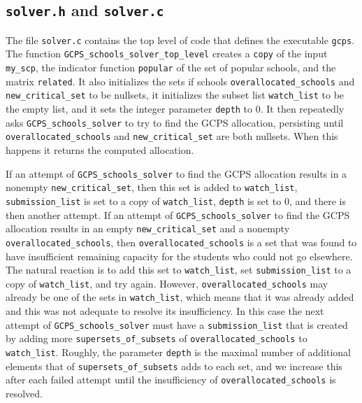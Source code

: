 \documentclass[12pt]{article}
\theoremstyle{definition}
\begin{document}
\begin{appendix}
\subsection{\texttt{solver.h} and \texttt{solver.c}} \label{subsec:Solver}

The file \texttt{solver.c} contains the top level of code that defines
the executable \texttt{gcps}.  The function
\texttt{GCPS\_schools\_solver\_top\_level} creates a \texttt{copy} of
the input \texttt{my\_scp}, the indicator function \texttt{popular} of
the set of popular schools, and the matrix \texttt{related}.  It also
initializes the sets if schools \texttt{overallocated\_schools} and
\texttt{new\_critical\_set} to be nullsets, it initializes the subset
list \texttt{watch\_list} to be the empty list, and it sets the
integer parameter \texttt{depth} to $0$.  It then repeatedly asks
\texttt{GCPS\_schools\_solver} to try to find the GCPS allocation,
persisting until \texttt{overallocated\_schools} and
\texttt{new\_critical\_set} are both nullsets.  When this happens it
returns the computed allocation.

If an attempt of \texttt{GCPS\_schools\_solver} to find the GCPS
allocation results in a nonempty \texttt{new\_critical\_set}, then
this set is added to \texttt{watch\_list}, \texttt{submission\_list}
is set to a copy of \texttt{watch\_list}, \texttt{depth} is set to
$0$, and there is then another attempt.  If an attempt of
\texttt{GCPS\_schools\_solver} to find the GCPS allocation results in
an empty \texttt{new\_critical\_set} and a nonempty
\texttt{overallocated\_schools}, then \texttt{overallocated\_schools}
is a set that was found to have insufficient remaining capacity for
the students who could not go elsewhere.  The natural reaction is to
add this set to \texttt{watch\_list}, set \texttt{submission\_list} to
a copy of \texttt{watch\_list}, and try again.  However,
\texttt{overallocated\_schools} may already be one of the sets in
\texttt{watch\_list}, which means that it was already added and this
was not adequate to resolve its insufficiency.  In this case the next
attempt of \texttt{GCPS\_schools\_solver} must have a
\texttt{submission\_list} that is created by adding more
\texttt{supersets\_of\_subsets} of \texttt{overallocated\_schools} to
\texttt{watch\_list}.  Roughly, the parameter \texttt{depth} is the
maximal number of additional elements that of
\texttt{supersets\_of\_subsets} adds to each set, and we increase this
after each failed attempt until the insufficiency of
\texttt{overallocated\_schools} is resolved.


\end{appendix}
\end{document}
